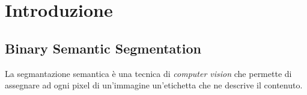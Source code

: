 

\chapter{Introduzione} %
\label{chap:Introduzione}



\section{Binary Semantic Segmentation}

La segmantazione semantica è una tecnica di \textit{computer vision} che permette di assegnare ad ogni pixel di un'immagine un'etichetta che ne descrive il contenuto.

